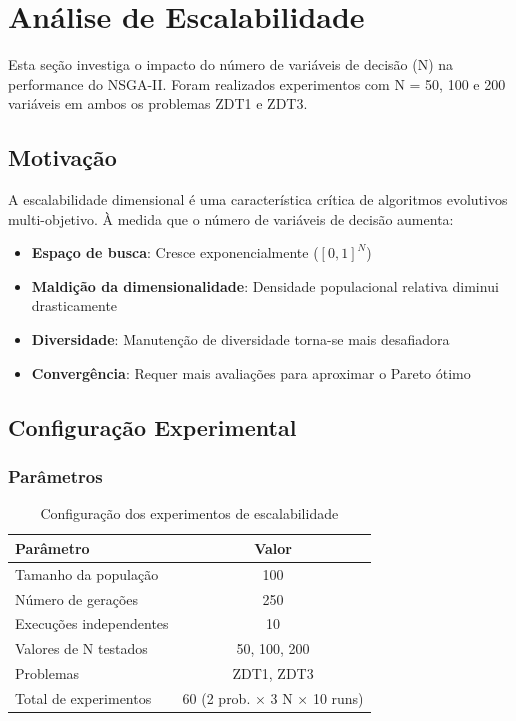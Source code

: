 
\section{Análise de Escalabilidade}

Esta seção investiga o impacto do número de variáveis de decisão (N) na performance do NSGA-II. Foram realizados experimentos com N = 50, 100 e 200 variáveis em ambos os problemas ZDT1 e ZDT3.

\subsection{Motivação}

A escalabilidade dimensional é uma característica crítica de algoritmos evolutivos multi-objetivo. À medida que o número de variáveis de decisão aumenta:

\begin{itemize}
    \item \textbf{Espaço de busca}: Cresce exponencialmente ($[0,1]^N$)
    \item \textbf{Maldição da dimensionalidade}: Densidade populacional relativa diminui drasticamente
    \item \textbf{Diversidade}: Manutenção de diversidade torna-se mais desafiadora
    \item \textbf{Convergência}: Requer mais avaliações para aproximar o Pareto ótimo
\end{itemize}

\subsection{Configuração Experimental}

\subsubsection{Parâmetros}

\begin{table}[H]
\centering
\caption{Configuração dos experimentos de escalabilidade}
\begin{tabular}{@{}lc@{}}
\toprule
\textbf{Parâmetro} & \textbf{Valor} \\
\midrule
Tamanho da população & 100 \\
Número de gerações & 250 \\
Execuções independentes & 10 \\
Valores de N testados & 50, 100, 200 \\
Problemas & ZDT1, ZDT3 \\
\midrule
Total de experimentos & 60 (2 prob. × 3 N × 10 runs) \\
\bottomrule
\end{tabular}
\end{table}

